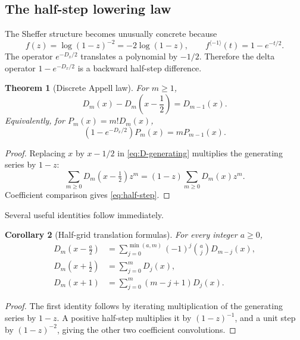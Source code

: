 \documentclass[11pt,oneside]{article}
\newtheorem{theorem}{Theorem}[section]
\newtheorem{corollary}[theorem]{Corollary}
\theoremstyle{definition}
\theoremstyle{remark}
\newcommand{\Diag}{D}
\begin{document}
\subsection{The half-step lowering law}

The Sheffer structure becomes unusually concrete because
\[
 f(z)=\log(1-z)^{-2}=-2\log(1-z),
 \qquad
 f^{\langle-1\rangle}(t)=1-e^{-t/2}.
\]
The operator $e^{-D_x/2}$ translates a polynomial by $-1/2$.  Therefore the
delta operator $1-e^{-D_x/2}$ is a backward half-step difference.

\begin{theorem}[Discrete Appell law]
\label{thm:half-step}
For $m\ge1$,
\begin{equation}
 \boxed{\quad
 \Diag_m(x)-\Diag_m\!\left(x-\frac12\right)=\Diag_{m-1}(x).
 \quad}
 \label{eq:half-step}
\end{equation}
Equivalently, for $P_m(x)=m!\Diag_m(x)$,
\[
 \left(1-e^{-D_x/2}\right)P_m(x)=mP_{m-1}(x).
\]
\end{theorem}

\begin{proof}
Replacing $x$ by $x-1/2$ in \eqref{eq:D-generating} multiplies the generating
series by $1-z$:
\[
 \sum_{m\ge0}\Diag_m\!\left(x-\tfrac12\right)z^m
 =(1-z)\sum_{m\ge0}\Diag_m(x)z^m.
\]
Coefficient comparison gives \eqref{eq:half-step}.
\end{proof}

Several useful identities follow immediately.

\begin{corollary}[Half-grid translation formulas]
\label{cor:translations}
For every integer $a\ge0$,
\begin{align}
 \Diag_m\!\left(x-\frac a2\right)
 &=\sum_{j=0}^{\min(a,m)}(-1)^j\binom aj\Diag_{m-j}(x),
 \label{eq:negative-shift}\\
 \Diag_m\!\left(x+\frac12\right)
 &=\sum_{j=0}^{m}\Diag_j(x),
 \label{eq:positive-half-shift}\\
 \Diag_m(x+1)
 &=\sum_{j=0}^{m}(m-j+1)\Diag_j(x).
 \label{eq:unit-shift}
\end{align}
\end{corollary}

\begin{proof}
The first identity follows by iterating multiplication of the generating
series by $1-z$.  A positive half-step multiplies it by $(1-z)^{-1}$, and a
unit step by $(1-z)^{-2}$, giving the other two coefficient convolutions.
\end{proof}
\end{document}
